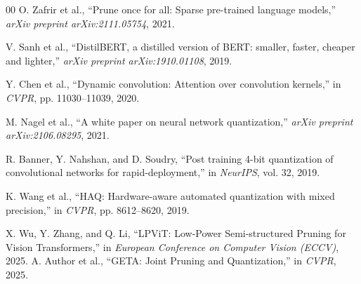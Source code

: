 \documentclass[11pt, conference]{IEEEtran}
\begin{document}
\begin{thebibliography}{00}
O. Zafrir et al., ``Prune once for all: Sparse pre-trained language models,'' \textit{arXiv preprint arXiv:2111.05754}, 2021.

V. Sanh et al., ``DistilBERT, a distilled version of BERT: smaller, faster, cheaper and lighter,'' \textit{arXiv preprint arXiv:1910.01108}, 2019.

Y. Chen et al., ``Dynamic convolution: Attention over convolution kernels,'' in \textit{CVPR}, pp. 11030--11039, 2020.

M. Nagel et al., ``A white paper on neural network quantization,'' \textit{arXiv preprint arXiv:2106.08295}, 2021.

R. Banner, Y. Nahshan, and D. Soudry, ``Post training 4-bit quantization of convolutional networks for rapid-deployment,'' in \textit{NeurIPS}, vol. 32, 2019.

K. Wang et al., ``HAQ: Hardware-aware automated quantization with mixed precision,'' in \textit{CVPR}, pp. 8612--8620, 2019.

X. Wu, Y. Zhang, and Q. Li, ``LPViT: Low-Power Semi-structured Pruning for Vision Transformers,'' in \textit{European Conference on Computer Vision (ECCV)}, 2025.
A. Author et al., ``GETA: Joint Pruning and Quantization,'' in \textit{CVPR}, 2025.
\end{thebibliography}
\end{document}
